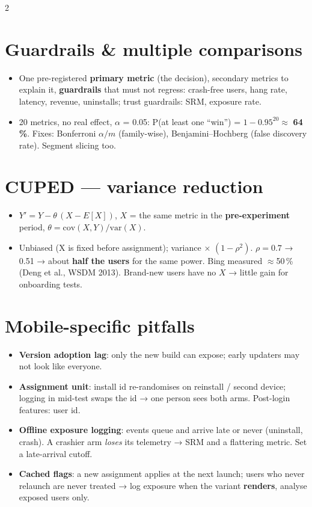 \documentclass[8pt]{extarticle}
\begin{document}
\begin{multicols}{2}
\section{Guardrails \& multiple comparisons}
\begin{itemize}
  \item One pre-registered \textbf{primary metric} (the decision), secondary metrics to explain it,
        \textbf{guardrails} that must not regress: crash-free users, hang rate, latency, revenue,
        uninstalls; trust guardrails: SRM, exposure rate.
  \item 20 metrics, no real effect, $\alpha$ = 0.05: P(at least one ``win'') = $1-0.95^{20} \approx$ \textbf{64\,\%}.
        Fixes: Bonferroni $\alpha/m$ (family-wise), Benjamini–Hochberg (false discovery rate). Segment slicing too.
\end{itemize}

\section{CUPED — variance reduction}
\begin{itemize}
  \item $Y' = Y - \theta\,(X - E[X])$, $X$ = the same metric in the \textbf{pre-experiment}
        period, $\theta = \mathrm{cov}(X,Y)/\mathrm{var}(X)$.
  \item Unbiased (X is fixed before assignment); variance × $(1-\rho^2)$. $\rho = 0.7$ → 0.51 → about
        \textbf{half the users} for the same power. Bing measured $\approx$50\,\% (Deng et al., WSDM 2013).
        Brand-new users have no $X$ → little gain for onboarding tests.
\end{itemize}

\section{Mobile-specific pitfalls}
\begin{itemize}
  \item \textbf{Version adoption lag}: only the new build can expose; early updaters may not look
        like everyone.
  \item \textbf{Assignment unit}: install id re-randomises on reinstall / second device; logging in
        mid-test swaps the id → one person sees both arms. Post-login features: user id.
  \item \textbf{Offline exposure logging}: events queue and arrive late or never (uninstall,
        crash). A crashier arm \emph{loses} its telemetry → SRM and a flattering metric. Set a late-arrival cutoff.
  \item \textbf{Cached flags}: a new assignment applies at the next launch; users who never relaunch
        are never treated → log exposure when the variant \textbf{renders}, analyse exposed users only.
\end{itemize}


\end{multicols}
\end{document}
